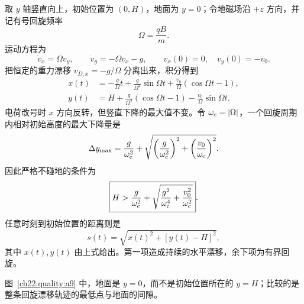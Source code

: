 {\begin{xesolution}
取 $y$ 轴竖直向上，初始位置为 $(0,H)$，地面为 $y=0$；令地磁场沿 $+z$ 方向，并记有号回旋频率
\[
  \Omega=\frac{qB}{m}.
\]
运动方程为
\[
  \dot v_x=\Omega v_y,
  \qquad
  \dot v_y=-\Omega v_x-g,
  \qquad v_x(0)=0,\quad v_y(0)=-v_0.
\]
把恒定的重力漂移 $v_{D,x}=-g/\Omega$ 分离出来，积分得到
\begin{align}
  x(t)&=-\frac g\Omega t+\frac g{\Omega^2}\sin\Omega t
       +\frac{v_0}{\Omega}(\cos\Omega t-1),\\
  y(t)&=H+\frac g{\Omega^2}(\cos\Omega t-1)
       -\frac{v_0}{\Omega}\sin\Omega t.
\end{align}
电荷改号时 $x$ 方向反转，但竖直下降的最大值不变。令
$\omega_{\rm c}=|\Omega|$，一个回旋周期内相对初始高度的最大下降量是
\begin{equation}
  \Delta y_{\max}=\frac g{\omega_{\rm c}^2}
  +\sqrt{\left(\frac g{\omega_{\rm c}^2}\right)^2
  +\left(\frac{v_0}{\omega_{\rm c}}\right)^2}.
\end{equation}
因此严格不碰地的条件为
\begin{equation}
  \boxed{H>\frac g{\omega_{\rm c}^2}
  +\sqrt{\frac{g^2}{\omega_{\rm c}^4}+\frac{v_0^2}{\omega_{\rm c}^2}}}.
\end{equation}
任意时刻到初始位置的距离则是
\begin{equation}
  \boxed{s(t)=\sqrt{x(t)^2+[y(t)-H]^2}},
\end{equation}
其中 $x(t),y(t)$ 由上式给出。第一项造成持续的水平漂移，余下项为有界回旋。

\begin{rTwoFigure}
\par{}

\end{rTwoFigure}

图~\ref{ch22:quality:a9} 中，地面是 $y=0$，而不是初始位置所在的 $y=H$；比较的是整条回旋漂移轨迹的最低点与地面的间隙。
\end{xesolution}



}
